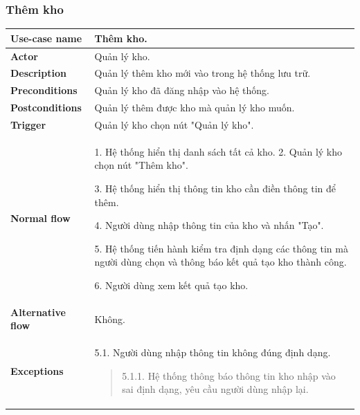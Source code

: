         \subsubsection{Thêm kho}
        {
\setlength\extrarowheight{6pt}
            \begin{longtable}{| p{} | p{} |} 
                \hline
                 \textbf{Use-case name} 
                & 
                Thêm kho.
                \\
                \hline
                \textbf{Actor} 
                & 
                Quản lý kho.
                \\
                \hline
                \textbf{Description} 
                & 
                Quản lý thêm kho mới vào trong hệ thống lưu trữ.
                \\
                \hline
                 \textbf{Preconditions} 
                &
                Quản lý kho đã đăng nhập vào hệ thống.
                \\
                \hline
                \textbf{Postconditions} 
                & 
                Quản lý thêm được kho mà quản lý kho muốn.
                \\
                \hline
                \textbf{Trigger} 
                & 
                Quản lý kho chọn nút "Quản lý kho".
                \\
                \hline
                \begin{flushleft}
                 \textbf{Normal flow}
                \end{flushleft}
                & 
                1. Hệ thống hiển thị danh sách tất cả kho.
                    2. Quản lý kho chọn nút "Thêm kho".
                    
                    3. Hệ thống hiển thị thông tin kho cần điền thông tin để thêm.
                    
                    4. Người dùng nhập thông tin của kho và nhấn "Tạo".
                    
                    5. Hệ thống tiến hành kiểm tra định dạng các thông tin mà người dùng chọn và thông báo kết quả tạo kho thành công.
                    
                    6. Người dùng xem kết quả tạo kho.
                \\
                \hline
                \textbf{Alternative flow}
                & 
                Không.
                \\
                \hline
                \textbf{Exceptions} 
                &
                5.1. Người dùng nhập thông tin không đúng định dạng.
                    \begin{quote}
                    5.1.1. Hệ thống thông báo thông tin kho nhập vào sai định dạng, yêu cầu người dùng nhập lại.
                    

\end{quote}
\end{longtable}}
